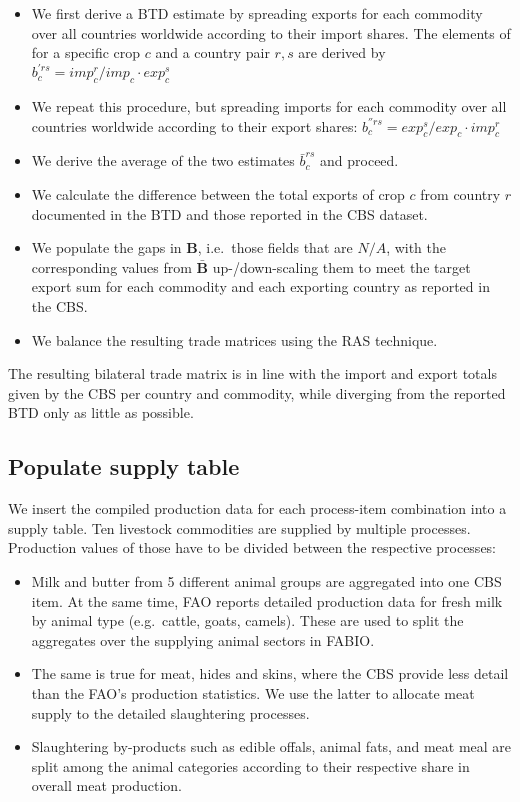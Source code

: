 \documentclass[]{article}
\begin{document}
\begin{itemize}
\item
  We first derive a BTD estimate by spreading exports for each commodity
  over all countries worldwide according to their import shares. The
  elements of for a specific crop \(c\) and a country pair \(r, s\) are
  derived by \(b_{c}^{'rs} = imp_{c}^{r}/imp_{c} \cdot exp_{c}^{s}\)
\item
  We repeat this procedure, but spreading imports for each commodity
  over all countries worldwide according to their export shares:
  \(b_{c}^{''rs} = exp_{c}^{s}/exp_{c} \cdot imp_{c}^{r}\)
\item
  We derive the average of the two estimates \(\bar{b}_{c}^{rs}\) and
  proceed.
\item
  We calculate the difference between the total exports of crop \(c\)
  from country \(r\) documented in the BTD and those reported in the CBS
  dataset.
\item
  We populate the gaps in \(\mathbf{B}\), i.e.~those fields that are
  \(N/A\), with the corresponding values from \(\mathbf{\bar{B}}\)
  up-/down-scaling them to meet the target export sum for each commodity
  and each exporting country as reported in the CBS.
\item
  We balance the resulting trade matrices using the RAS technique.
\end{itemize}

The resulting bilateral trade matrix is in line with the import and
export totals given by the CBS per country and commodity, while
diverging from the reported BTD only as little as possible.

\subsection{Populate supply table}\label{populate-supply-table}

We insert the compiled production data for each process-item combination
into a supply table. Ten livestock commodities are supplied by multiple
processes. Production values of those have to be divided between the
respective processes:

\begin{itemize}
\item
  Milk and butter from 5 different animal groups are aggregated into one
  CBS item. At the same time, FAO reports detailed production data for
  fresh milk by animal type (e.g.~cattle, goats, camels). These are used
  to split the aggregates over the supplying animal sectors in FABIO.
\item
  The same is true for meat, hides and skins, where the CBS provide less
  detail than the FAO's production statistics. We use the latter to
  allocate meat supply to the detailed slaughtering processes.
\item
  Slaughtering by-products such as edible offals, animal fats, and meat
  meal are split among the animal categories according to their
  respective share in overall meat production.
\end{itemize}
\end{document}
